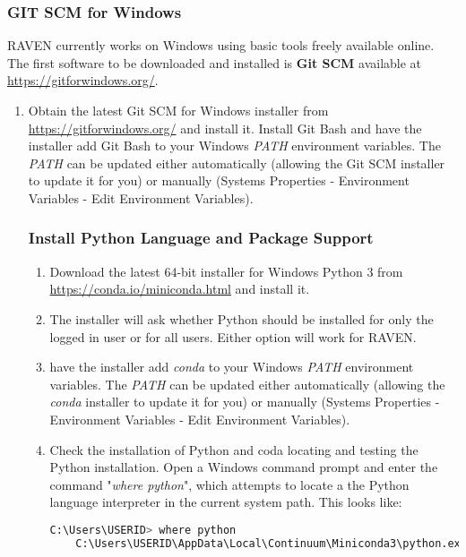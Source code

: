 \subsubsection{GIT SCM for Windows}
RAVEN currently works on Windows using basic tools freely available online. 
The first software to be downloaded and installed is \textbf{Git SCM} available at \url{https://gitforwindows.org/}.
\begin{enumerate}
    \item Obtain the latest Git SCM for Windows installer from  \url{https://gitforwindows.org/} and install it. 
    Install Git Bash and have 
    the installer add Git Bash to your Windows \textit{PATH} environment variables. 
    The \textit{PATH} can be updated either automatically (allowing the Git SCM installer to update it for you) or manually 
    (Systems Properties - Environment Variables - Edit Environment Variables).

\subsubsection{Install Python Language and Package Support}
\begin{enumerate}
	\item Download the latest 64-bit installer for Windows Python 3 from
		\url{https://conda.io/miniconda.html} and install it.  \item The installer
		will ask whether Python should be installed for only the logged in user or
		for all users.  Either option will work for RAVEN.
	\item 	have  the installer add \textit{conda} to your Windows \textit{PATH} environment variables.   
	The \textit{PATH} can be updated either automatically (allowing the  \textit{conda} installer to update it for you) 
	or manually (Systems Properties - Environment Variables - Edit Environment Variables).
	\item Check the installation of Python and coda locating and testing the Python installation.   
	Open a Windows command prompt and enter the
		command "{\it where python}", which attempts to locate a the Python language interpreter
		in the current system path.  This looks like:

    \begin{lstlisting}[language=bash, basicstyle=\small]
    C:\Users\USERID> where python
    C:\Users\USERID\AppData\Local\Continuum\Miniconda3\python.exe
    \end{lstlisting}


\end{enumerate}
\end{enumerate}
